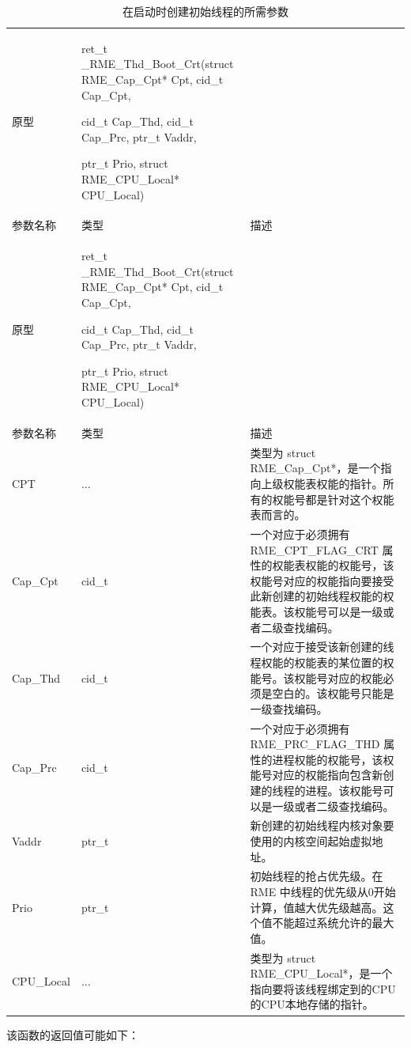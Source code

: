 \begin{xltabular}{\textwidth}{@{}>{\hsize\raggedright\arraybackslash}X>{\hsize\raggedright\arraybackslash}X>{\hsize\raggedright\arraybackslash}X@{}}
\caption{在启动时创建初始线程的所需参数}\label{tab:7-59-create-initial-thread-at-boot-parameters}\\
\toprule
原型\strut
 & ret\_t \_RME\_Thd\_Boot\_Crt(struct RME\_Cap\_Cpt* Cpt, cid\_t Cap\_Cpt,

cid\_t Cap\_Thd, cid\_t Cap\_Prc, ptr\_t Vaddr,

ptr\_t Prio, struct RME\_CPU\_Local* CPU\_Local)\strut
 & \strut
\tabularnewline
参数名称 & 类型 & 描述\tabularnewline
\endfirsthead
\toprule
原型\strut
 & ret\_t \_RME\_Thd\_Boot\_Crt(struct RME\_Cap\_Cpt* Cpt, cid\_t Cap\_Cpt,

cid\_t Cap\_Thd, cid\_t Cap\_Prc, ptr\_t Vaddr,

ptr\_t Prio, struct RME\_CPU\_Local* CPU\_Local)\strut
 & \strut
\tabularnewline
参数名称 & 类型 & 描述\tabularnewline
\midrule
\endhead
\bottomrule
\endlastfoot
CPT & ... &
类型为 struct RME\_Cap\_Cpt*，是一个指向上级权能表权能的指针。所有的权能号都是针对这个权能表而言的。\tabularnewline
Cap\_Cpt & cid\_t &
一个对应于必须拥有 RME\_CPT\_FLAG\_CRT 属性的权能表权能的权能号，该权能号对应的权能指向要接受此新创建的初始线程权能的权能表。该权能号可以是一级或者二级查找编码。\tabularnewline
Cap\_Thd & cid\_t &
一个对应于接受该新创建的线程权能的权能表的某位置的权能号。该权能号对应的权能必须是空白的。该权能号只能是一级查找编码。\tabularnewline
Cap\_Prc & cid\_t &
一个对应于必须拥有 RME\_PRC\_FLAG\_THD 属性的进程权能的权能号，该权能号对应的权能指向包含新创建的线程的进程。该权能号可以是一级或者二级查找编码。\tabularnewline
Vaddr & ptr\_t &
新创建的初始线程内核对象要使用的内核空间起始虚拟地址。\tabularnewline
Prio & ptr\_t &
初始线程的抢占优先级。在 RME 中线程的优先级从0开始计算，值越大优先级越高。这个值不能超过系统允许的最大值。\tabularnewline
CPU\_Local & ... &
类型为 struct RME\_CPU\_Local*，是一个指向要将该线程绑定到的CPU的CPU本地存储的指针。\tabularnewline
\end{xltabular}

该函数的返回值可能如下：

